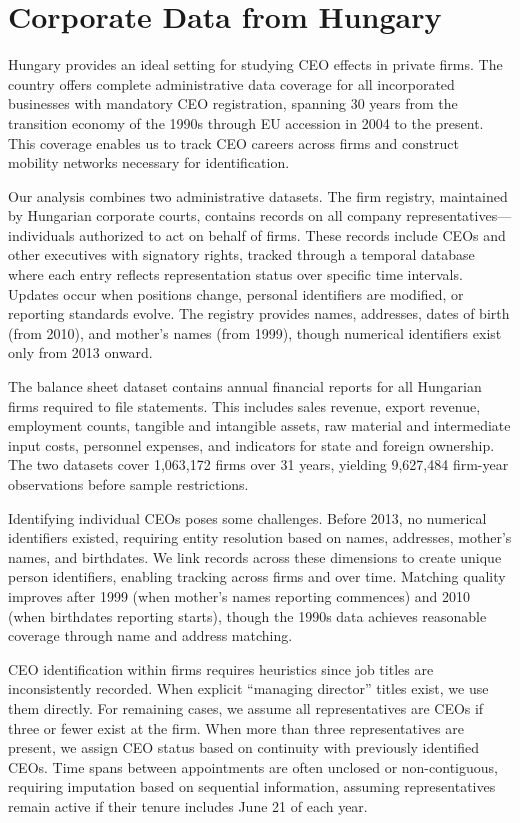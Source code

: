 \documentclass[11pt,a4paper]{article}
\begin{document}
\section{Corporate Data from Hungary}

Hungary provides an ideal setting for studying CEO effects in private firms. The country offers complete administrative data coverage for all incorporated businesses with mandatory CEO registration, spanning 30 years from the transition economy of the 1990s through EU accession in 2004 to the present. This coverage enables us to track CEO careers across firms and construct mobility networks necessary for identification.

Our analysis combines two administrative datasets. The firm registry, maintained by Hungarian corporate courts, contains records on all company representatives—individuals authorized to act on behalf of firms. These records include CEOs and other executives with signatory rights, tracked through a temporal database where each entry reflects representation status over specific time intervals. Updates occur when positions change, personal identifiers are modified, or reporting standards evolve. The registry provides names, addresses, dates of birth (from 2010), and mother's names (from 1999), though numerical identifiers exist only from 2013 onward.

The balance sheet dataset contains annual financial reports for all Hungarian firms required to file statements. This includes sales revenue, export revenue, employment counts, tangible and intangible assets, raw material and intermediate input costs, personnel expenses, and indicators for state and foreign ownership. The two datasets cover 1,063,172 firms over 31 years, yielding 9,627,484 firm-year observations before sample restrictions.

Identifying individual CEOs poses some challenges. Before 2013, no numerical identifiers existed, requiring entity resolution based on names, addresses, mother's names, and birthdates. We link records across these dimensions to create unique person identifiers, enabling tracking across firms and over time. Matching quality improves after 1999 (when mother's names reporting commences) and 2010 (when birthdates reporting starts), though the 1990s data achieves reasonable coverage through name and address matching. 

CEO identification within firms requires heuristics since job titles are inconsistently recorded. When explicit ``managing director'' titles exist, we use them directly. For remaining cases, we assume all representatives are CEOs if three or fewer exist at the firm. When more than three representatives are present, we assign CEO status based on continuity with previously identified CEOs. Time spans between appointments are often unclosed or non-contiguous, requiring imputation based on sequential information, assuming representatives remain active if their tenure includes June 21 of each year.
\end{document}
